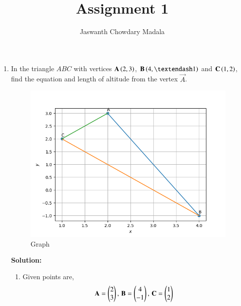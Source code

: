 \documentclass[journal,12pt,twocolumn]{IEEEtran}
\begin{document}
\vspace{3cm}


\title{Assignment 1}
\author{Jaswanth Chowdary Madala}





\maketitle

\newpage


\bigskip

\renewcommand{\thefigure}{\theenumi}
\renewcommand{\thetable}{\theenumi}


\begin{enumerate}

\item In the triangle $ABC$ with vertices $\mathbf{A} \left(2, 3\right)$, $\vec{B} \brak{4, –1}$ and $\mathbf{C} \left(1, 2\right)$, find the equation and length of altitude from the vertex $\vec{A}$.

\begin{figure}[ht]
\centering
\includegraphics[width = \columnwidth]{"./figs/fig.png"}
\caption{Graph}
\label{fig:1}
\end{figure}

\textbf{Solution:}
\begin{enumerate}
\item Given points are,
\begin{align}
\mathbf{A} = \begin{pmatrix}2\\3\end{pmatrix},\, \mathbf{B} = \begin{pmatrix}4\\-1\end{pmatrix},\, \mathbf{C}= \begin{pmatrix}1\\2\end{pmatrix}
\end{align}


\end{enumerate}
\end{enumerate}
\end{document}
